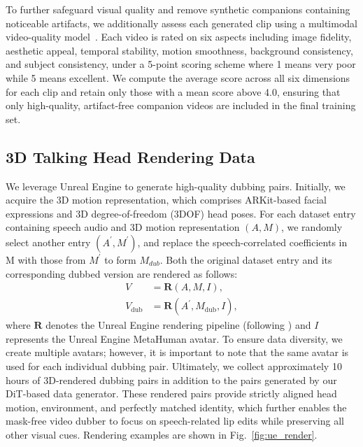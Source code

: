 To further safeguard visual quality and remove synthetic companions containing noticeable artifacts, we additionally assess each generated clip using a multimodal video-quality model~\cite{han2025videobench}.
Each video is rated on six aspects including image fidelity, aesthetic appeal, temporal stability, motion smoothness, background consistency, and subject consistency, under a 5-point scoring scheme where 1 means very poor while 5 means excellent.
We compute the average score across all six dimensions for each clip and retain only those with a mean score above 4.0, ensuring that only high-quality, artifact-free companion videos are included in the final training set.

\subsection{3D Talking Head Rendering Data}
We leverage Unreal Engine to generate high-quality dubbing pairs. Initially, we acquire the 3D motion representation, which comprises ARKit-based facial expressions and 3D degree-of-freedom (3DOF) head poses. For each dataset entry containing speech audio and 3D motion representation $(A, M)$, we randomly select another entry $(A^{\prime}, M^{\prime})$, and replace the speech-correlated coefficients in M with those from $M^{\prime}$ to form $M_{dub}$. Both the original dataset entry and its corresponding dubbed version are rendered as follows:
\begin{equation}
\begin{aligned}
V &= \mathbf{R}(A, M, I), \\
V_{\text{dub}} &= \mathbf{R}(A^{\prime}, M_{\text{dub}}, I),
\end{aligned}
\end{equation}
where $\mathbf{R}$ denotes the Unreal Engine rendering pipeline (following \cite{chen2025cafe}) and $I$ represents the Unreal Engine MetaHuman avatar. To ensure data diversity, we create multiple avatars; however, it is important to note that the same avatar is used for each individual dubbing pair. 
Ultimately, we collect approximately 10 hours of 3D-rendered dubbing pairs in addition to the pairs generated by our DiT-based data generator.
These rendered pairs provide strictly aligned head motion, environment, and perfectly matched identity, which further enables the mask-free video dubber to focus on speech-related lip edits while preserving all other visual cues. 
Rendering examples are shown in Fig.~\ref{fig:ue_render}.

